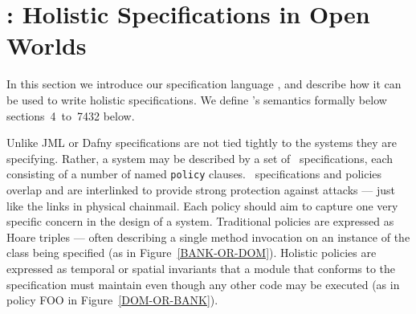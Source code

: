  


\section{\Chainmail: Holistic Specifications in Open Worlds}



In this section we introduce our specification language \Chainmail,
and describe how it can be used to write holistic specifications.
We define \Chainmail's semantics formally below 
sections~4~to~7432 below.




  
Unlike JML or Dafny \cite{jml,daafny} \Chainmail specifications are not
tied tightly to the systems they are specifying. Rather, a system may
be described by a set of \Chainmail\ specifications, each consisting of
a number of named \lstinline+policy+ clauses.
\Chainmail\ specifications and policies overlap and are interlinked to
provide strong protection against attacks --- just like the links in
physical chainmail.  Each policy should aim to capture one very
specific concern in the design of a system. Traditional policies are
expressed as Hoare triples --- often describing a single method
invocation on an instance of the class being specified (as in
Figure~\ref{BANK-OR-DOM}).  Holistic policies are expressed as 
temporal or spatial invariants that a module that
conforms to the specification must maintain even though any other code
may be executed (as in policy FOO in Figure~\ref{DOM-OR-BANK}).


